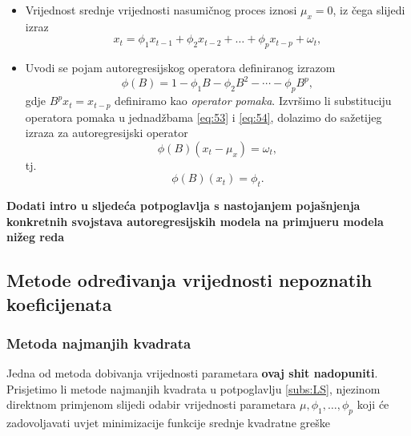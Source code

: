 \documentclass[a4paper,12pt,oneside]{memoir}
\begin{document}
            \begin{itemize}
                \item Vrijednost srednje vrijednosti nasumičnog proces iznosi $\mu_x=0$, iz čega slijedi izraz
                \begin{equation}
                    x_t=\phi_1x_{t-1}+\phi_2x_{t-2}+\ldots+\phi_px_{t-p}+\omega_t,
                    \label{eq:53}
                \end{equation}
                \item Uvodi se pojam autoregresijskog operatora definiranog izrazom
                \begin{equation}
                    \phi(B)=1-\phi_1B-\phi_2B^2-\cdots-\phi_pB^p,
                    \label{eq:54}
                \end{equation}
                gdje $B^px_t=x_{t-p}$ definiramo kao \textit{operator pomaka}. Izvršimo li substituciju operatora pomaka u jednadžbama \ref{eq:53} i \ref{eq:54}, dolazimo do sažetijeg izraza za autoregresijski operator
                \begin{equation}
                    \phi(B)(x_t-\mu_x)=\omega_t,
                \end{equation}
                tj.
                \begin{equation}
                    \phi(B)(x_t)=\phi_t.
                \end{equation}
            \end{itemize}



            \textbf{Dodati intro u sljedeća potpoglavlja s nastojanjem pojašnjenja konkretnih svojstava autoregresijskih modela na primjueru modela nižeg reda}

            \subsection{Metode određivanja vrijednosti nepoznatih koeficijenata}


            \subsubsection{Metoda najmanjih kvadrata}

            Jedna od metoda dobivanja vrijednosti parametara \textbf{ovaj shit nadopuniti}. Prisjetimo li metode najmanjih kvadrata u potpoglavlju \ref{subs:LS}, njezinom direktnom primjenom slijedi odabir vrijednosti parametara $\mu,\phi_1,\ldots,\phi_p$ koji će zadovoljavati uvjet minimizacije funkcije srednje kvadratne greške
            
\end{document}
